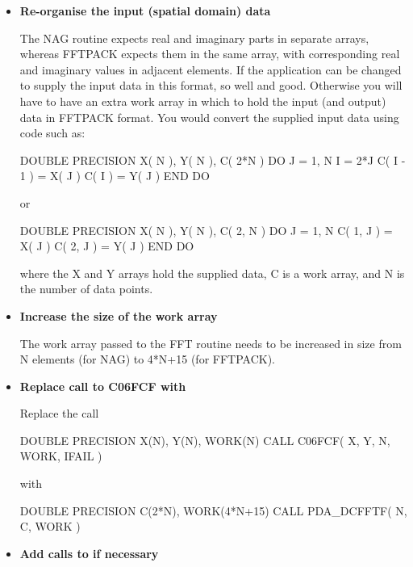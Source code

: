 \documentclass[11pt,twoside,nolof]{starlink}
\begin{document}
\begin{itemize}

\item\textbf{Re-organise the input (spatial domain) data}

   The NAG routine expects real and imaginary parts in separate arrays,
   whereas FFTPACK expects them in the same array, with corresponding
   real and imaginary values in adjacent elements. If the application
   can be changed to supply the input data in this format, so well and
   good. Otherwise you will have to have an extra work array in which to
   hold the input (and output) data in FFTPACK format. You would convert
   the supplied input data using code such as:

\begin{terminalv}
      DOUBLE PRECISION X( N ), Y( N ), C( 2*N )
      DO J = 1, N
         I = 2*J
         C( I - 1 ) = X( J )
         C( I ) = Y( J )
      END DO
\end{terminalv}

   or

\begin{terminalv}
      DOUBLE PRECISION X( N ), Y( N ), C( 2, N )
      DO J = 1, N
         C( 1, J ) = X( J )
         C( 2, J ) = Y( J )
      END DO
\end{terminalv}

   where the X and Y arrays hold the supplied data, C is a work array,
   and N is the number of data points.

\item\textbf{Increase the size of the work array}

   The work array passed to the FFT routine needs to be increased in
   size from N elements (for NAG) to 4*N+15 (for FFTPACK).

\item\textbf{Replace call to C06FCF with
}

   Replace the call

\begin{terminalv}
      DOUBLE PRECISION X(N), Y(N), WORK(N)
      CALL C06FCF( X, Y, N, WORK, IFAIL )
\end{terminalv}

   with

\begin{terminalv}
      DOUBLE PRECISION C(2*N), WORK(4*N+15)
      CALL PDA_DCFFTF( N, C, WORK )
\end{terminalv}

\item\textbf{Add calls to
   if necessary}


\end{itemize}
\end{document}
